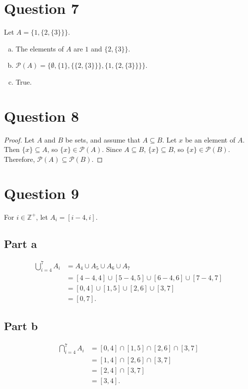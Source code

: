 \documentclass{article}
\begin{document}
\section*{Question 7}
Let $A = \{1, \{2, \{3\}\}\}$.
\begin{enumerate}[(a)]
    \item The elements of $A$ are $1$ and $\{2, \{3\}\}$.
    \item $\mathcal{P}(A) = \{\emptyset, \{1\}, \{\{2, \{3\}\}\}, \{1, \{2, \{3\}\}\}\}$.
    \item True.
\end{enumerate}

\section*{Question 8}
\begin{proof}
    Let $A$ and $B$ be sets, and assume that $A \subseteq B$.
    Let $x$ be an element of $A$.
    Then $\{x\} \subseteq A$, so $\{x\} \in \mathcal{P}(A)$.
    Since $A \subseteq B$, $\{x\} \subseteq B$, so $\{x\} \in \mathcal{P}(B)$.
    Therefore, $\mathcal{P}(A) \subseteq \mathcal{P}(B)$.
\end{proof}

\section*{Question 9}
For $i \in \mathbb{Z}^+$, let $A_i = [i-4, i]$.

\subsection*{Part a}
\begin{align*}
    \bigcup_{i=4}^{7} A_i &= A_4 \cup A_5 \cup A_6 \cup A_7 \\
    &= [4-4, 4] \cup [5-4, 5] \cup [6-4, 6] \cup [7-4, 7] \\
    &= [0, 4] \cup [1, 5] \cup [2, 6] \cup [3, 7] \\
    &= [0, 7].
\end{align*}

\subsection*{Part b}
\begin{align*}
    \bigcap_{i=4}^{7} A_i &= [0, 4] \cap [1, 5] \cap [2, 6] \cap [3, 7] \\
    &= [1, 4] \cap [2, 6] \cap [3, 7] \\
    &= [2, 4] \cap [3, 7] \\
    &= [3, 4].
\end{align*}
\end{document}
